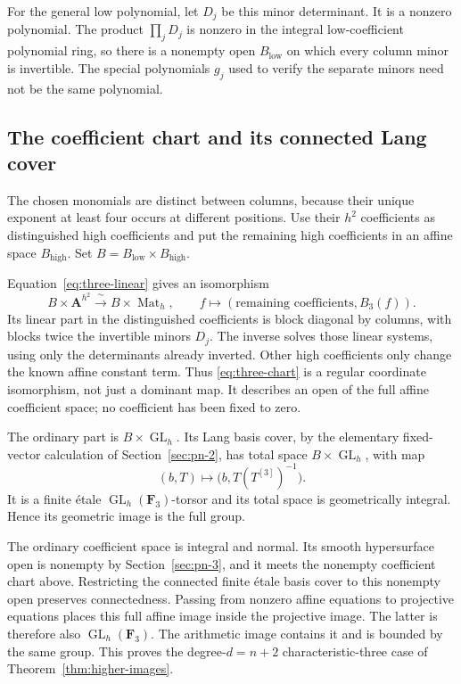 For the general low polynomial, let $D_j$ be this minor determinant. It is a nonzero polynomial. The product $\prod_jD_j$ is nonzero in the integral low-coefficient polynomial ring, so there is a nonempty open $B_{\mathrm{low}}$ on which every column minor is invertible. The special polynomials $g_j$ used to verify the separate minors need not be the same polynomial.

\subsection{The coefficient chart and its connected Lang cover}
The chosen monomials are distinct between columns, because their unique exponent at least four occurs at different positions. Use their $h^2$ coefficients as distinguished high coefficients and put the remaining high coefficients in an affine space $B_{\mathrm{high}}$. Set $B=B_{\mathrm{low}}\times B_{\mathrm{high}}$.

Equation~\eqref{eq:three-linear} gives an isomorphism
\begin{equation}\label{eq:three-chart}
B\times\mathbf A^{h^2}\xrightarrow{\ \sim\ }B\times\operatorname{Mat}_h,
\qquad f\longmapsto (\text{remaining coefficients},B_3(f)).
\end{equation}
Its linear part in the distinguished coefficients is block diagonal by columns, with blocks twice the invertible minors $D_j$. The inverse solves those linear systems, using only the determinants already inverted. Other high coefficients only change the known affine constant term. Thus \eqref{eq:three-chart} is a regular coordinate isomorphism, not just a dominant map. It describes an open of the full affine coefficient space; no coefficient has been fixed to zero.

The ordinary part is $B\times\operatorname{GL}_h$. Its Lang basis cover, by the elementary fixed-vector calculation of Section~\ref{sec:pn-2}, has total space $B\times\operatorname{GL}_h$, with map
\[
(b,T)\longmapsto\bigl(b,T(T^{[3]})^{-1}\bigr).
\]
It is a finite \'etale $\operatorname{GL}_h(\mathbf F_3)$-torsor and its total space is geometrically integral. Hence its geometric image is the full group.

The ordinary coefficient space is integral and normal. Its smooth hypersurface open is nonempty by Section~\ref{sec:pn-3}, and it meets the nonempty coefficient chart above. Restricting the connected finite \'etale basis cover to this nonempty open preserves connectedness. Passing from nonzero affine equations to projective equations places this full affine image inside the projective image. The latter is therefore also $\operatorname{GL}_h(\mathbf F_3)$. The arithmetic image contains it and is bounded by the same group. This proves the degree-$d=n+2$ characteristic-three case of Theorem~\ref{thm:higher-images}.
